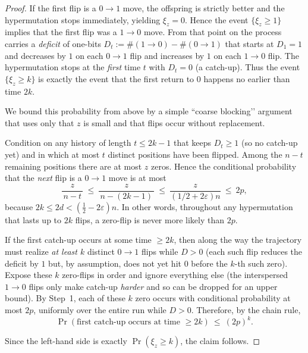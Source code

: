 \begin{proof}
	If the first flip is a $0\!\to 1$ move, the offspring is strictly better and the hypermutation stops immediately, yielding $\xi_z=0$. Hence the event $\{\xi_z\ge 1\}$ implies that the first flip was a $1\!\to 0$ move. From that point on the process carries a \emph{deficit} of one-bits $D_t:=\#(1\!\to 0)-\#(0\!\to 1)$ that starts at $D_1=1$ and decreases by $1$ on each $0\!\to 1$ flip and increases by $1$ on each $1\!\to 0$ flip. The hypermutation stops at the \emph{first} time $t$ with $D_t=0$ (a catch-up). Thus the event $\{\xi_z\ge k\}$ is exactly the event that the first return to $0$ happens no earlier than time $2k$.
	
	We bound this probability from above by a simple ``coarse blocking’’ argument that uses only that $z$ is small and that flips occur without replacement.
	
	\smallskip
	Condition on any history of length $t\le 2k-1$ that keeps $D_t\ge 1$ (so no catch-up yet) and in which at most $t$ distinct positions have been flipped. Among the $n-t$ remaining positions there are at most $z$ zeros. Hence the conditional probability that the \emph{next} flip is a $0\!\to 1$ move is at most
	\[
	\frac{z}{\,n-t\,}\ \le\ \frac{z}{\,n-(2k-1)\,}\ \le\ \frac{z}{(1/2+2\varepsilon)n}\ \le\ 2p,
	\]
	because $2k\le 2d<(\tfrac12-2\varepsilon)n$. In other words, throughout any hypermutation that lasts up to $2k$ flips, a zero-flip is never more likely than $2p$.
	
	\smallskip
	If the first catch-up occurs at some time $\ge 2k$, then along the way the trajectory must realize \emph{at least $k$} distinct $0\!\to 1$ flips while $D>0$ (each such flip reduces the deficit by $1$ but, by assumption, does not yet hit $0$ before the $k$-th such zero). Expose these $k$ zero-flips in order and ignore everything else (the interspersed $1\!\to 0$ flips only make catch-up \emph{harder} and so can be dropped for an upper bound). By Step~1, each of these $k$ zero occurs with conditional probability at most $2p$, uniformly over the entire run while $D>0$. Therefore, by the chain rule,
	\[
	\Pr(\text{first catch-up occurs at time }\ge 2k)\ \le\ (2p)^k.
	\]
	
	
	Since the left-hand side is exactly $\Pr(\xi_z\ge k)$, the claim follows.
\end{proof}




